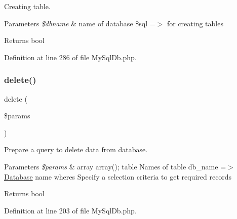 Creating table.


\begin{DoxyParams}{Parameters}
{\em \$dbname} & name of database \$sql =$>$ for creating tables\\
\hline
\end{DoxyParams}
\begin{DoxyReturn}{Returns}
bool 
\end{DoxyReturn}


Definition at line 286 of file My\+Sql\+Db.\+php.

\mbox{\label{class_zest_1_1_database_1_1_drives_1_1_m_y_s_q_l_1_1_my_sql_db_a2fb5b35138aabdbcdbabde07ff1df4b6}} 
\subsubsection{\texorpdfstring{delete()}{delete()}}
{\footnotesize\ttfamily delete (\begin{DoxyParamCaption}\item[{}]{\$params }\end{DoxyParamCaption})}

Prepare a query to delete data from database.


\begin{DoxyParams}{Parameters}
{\em \$params} & array array(); \textquotesingle{}table\textquotesingle{} Names of table \textquotesingle{}db\+\_\+name\textquotesingle{} =$>$ \mbox{\hyperlink{namespace_zest_1_1_database}{Database}} name \textquotesingle{}wheres\textquotesingle{} Specify a selection criteria to get required records\\
\hline
\end{DoxyParams}
\begin{DoxyReturn}{Returns}
bool 
\end{DoxyReturn}


Definition at line 203 of file My\+Sql\+Db.\+php.

\mbox{\label{class_zest_1_1_database_1_1_drives_1_1_m_y_s_q_l_1_1_my_sql_db_ae35a90b0a5f1b3d17dfbe5323b6d6983}} 
